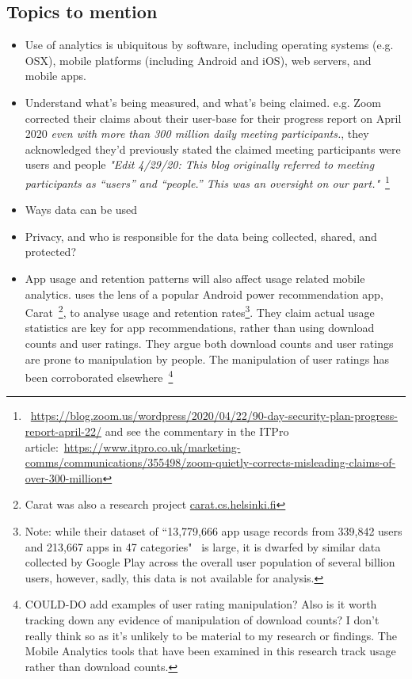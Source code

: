 \subsection{Topics to mention}
\begin{itemize}
    \item Use of analytics is ubiquitous by software, including operating systems (e.g. OSX), mobile platforms (including Android and iOS), web servers, and mobile apps. 
    \item Understand what's being measured, and what's being claimed. e.g. Zoom corrected their claims about their user-base for their progress report on  April 2020 \emph{even with more than 300 million daily meeting participants.}, they acknowledged they'd previously stated the claimed meeting participants were users and people \emph{"Edit 4/29/20: This blog originally referred to meeting participants as “users” and “people.” This was an oversight on our part."}~\footnote{~\url{https://blog.zoom.us/wordpress/2020/04/22/90-day-security-plan-progress-report-april-22/} and see the commentary in the ITPro article:~\url{https://www.itpro.co.uk/marketing-comms/communications/355498/zoom-quietly-corrects-misleading-claims-of-over-300-million}}
    \item Ways data can be used
    \item Privacy, and who is responsible for the data being collected, shared, and protected?
    \item App usage and retention patterns will also affect usage related mobile analytics. \citealp{sigg2016_sovereignty_of_apps_there_s_more_to_relevance_than_downloads} uses the lens of a popular Android power recommendation app, Carat~\footnote{Carat was also a research project \url{carat.cs.helsinki.fi}}, to analyse usage and retention rates\footnote{Note: while their dataset of ``13,779,666 app usage records from 339,842 users and 213,667 apps in 47 categories"~\citep[page 3]{sigg2016_sovereignty_of_apps_there_s_more_to_relevance_than_downloads} is large, it is dwarfed by similar data collected by Google Play across the overall user population of several billion users, however, sadly, this data is not available for analysis.}. They claim actual usage statistics are key for app recommendations, rather than using download counts and user ratings. They argue both download counts and user ratings are prone to manipulation by people. The manipulation of user ratings has been corroborated elsewhere~\footnote{COULD-DO add examples of user rating manipulation? Also is it worth tracking down any evidence of manipulation of download counts? I don't really think so as it's unlikely to be material to my research or findings. The Mobile Analytics tools that have been examined in this research track usage rather than download counts.}
\end{itemize}

